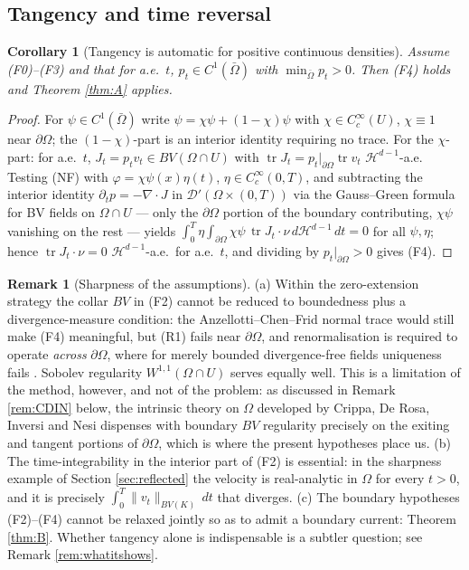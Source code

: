 \documentclass[11pt]{amsart}
\newtheorem{corollary}[theorem]{Corollary}
\theoremstyle{definition}
\newtheorem{remark}[theorem]{Remark}
\newcommand{\Hd}{\mathcal{H}^{d-1}}
\newcommand{\tr}{\operatorname{tr}}
\newcommand{\dive}{\nabla\!\cdot}
\newcommand{\dd}{\,d}
\begin{document}
\subsection{Tangency and time
reversal}

\begin{corollary}[Tangency is automatic for positive continuous
densities]\label{cor:auto}
Assume \textup{(F0)--(F3)} and that for a.e.\ $t$, $p_t\in
C^1(\bar\Omega)$ with $\min_{\bar\Omega}p_t>0$. Then \textup{(F4)}
holds and Theorem \ref{thm:A} applies.
\end{corollary}

\begin{proof}
For $\psi\in C^1(\bar\Omega)$ write $\psi=\chi\psi+(1-\chi)\psi$ with
$\chi\in C_c^\infty(U)$, $\chi\equiv1$ near $\partial\Omega$; the
$(1-\chi)$-part is an interior identity requiring no trace. For the
$\chi$-part: for a.e.\ $t$, $J_t=p_tv_t\in BV(\Omega\cap U)$ with
$\tr J_t=p_t|_{\partial\Omega}\tr v_t$ $\Hd$-a.e. Testing (NF) with
$\varphi=\chi\psi(x)\eta(t)$, $\eta\in C_c^\infty(0,T)$, and
subtracting the interior identity $\partial_tp=-\dive J$ in
$\mathcal{D}'(\Omega\times(0,T))$ via the Gauss--Green formula for
BV fields on $\Omega\cap U$ \cite{Anzellotti,ChenFrid} --- only the
$\partial\Omega$ portion of the boundary contributing, $\chi\psi$
vanishing on the rest --- yields
$\int_0^T\eta\int_{\partial\Omega}\chi\psi\,\tr
J_t\cdot\nu\,d\Hd\dd t=0$ for all $\psi,\eta$; hence $\tr
J_t\cdot\nu=0$ $\Hd$-a.e.\ for a.e.\ $t$, and dividing by
$p_t|_{\partial\Omega}>0$ gives (F4).
\end{proof}

\begin{remark}[Sharpness of the assumptions]\label{rem:sharp}
(a) Within the zero-extension strategy the collar $BV$ in (F2)
cannot be reduced to boundedness plus a divergence-measure condition:
the Anzellotti--Chen--Frid normal trace \cite{Anzellotti,ChenFrid}
would still make (F4) meaningful, but (R1) fails near
$\partial\Omega$, and renormalisation is required to operate
\emph{across} $\partial\Omega$, where for merely bounded
divergence-free fields uniqueness fails \cite{Depauw}. Sobolev
regularity $W^{1,1}(\Omega\cap U)$ serves equally well. This is a
limitation of the method, however, and not of the problem: as
discussed in Remark \ref{rem:CDIN} below, the intrinsic theory on
$\Omega$ developed by Crippa, De Rosa, Inversi and Nesi
\cite{CDRIN} dispenses with boundary $BV$ regularity precisely on
the exiting and tangent portions of $\partial\Omega$, which is where
the present hypotheses place us. (b) The
time-integrability in the interior part of (F2) is essential: in
the sharpness example of Section \ref{sec:reflected} the velocity is
real-analytic in $\Omega$ for every $t>0$, and it is precisely
$\int_0^T\|v_t\|_{BV(K)}\dd t$ that diverges. (c) The boundary
hypotheses \textup{(F2)--(F4)} cannot be relaxed jointly so as to
admit a boundary current: Theorem \ref{thm:B}. Whether tangency
alone is indispensable is a subtler question; see Remark
\ref{rem:whatitshows}.
\end{remark}
\end{document}
